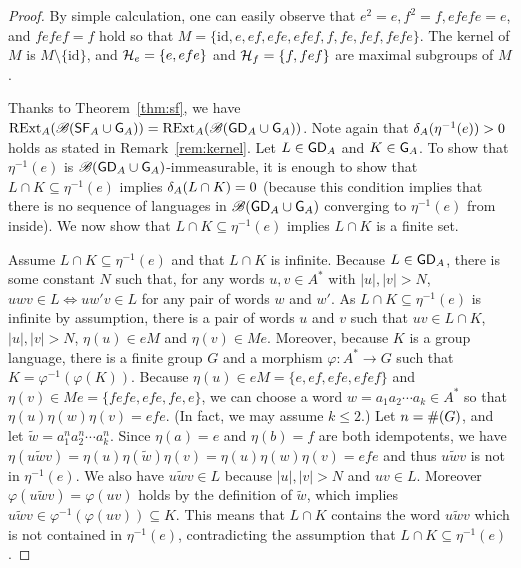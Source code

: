 \begin{proof}
By simple calculation, one can easily observe that 
\(e^2 = e, f^2 = f, efefe = e\), and \(fefef = f\) hold so that 
\(M = \{\mathrm{id},e,ef,efe,efef,f,fe,fef,fefe\}\).
The kernel of \(M\) is \(M \setminus \{\mathrm{id}\}\), and
\(\mathord{\mathrel{\cal H}_e} = \{e, efe\}\) and \(\mathord{\mathrel{\cal H}_f} = \{f, fef\}\) are maximal subgroups of \(M\).

Thanks to Theorem~\ref{thm:sf}, we have 
\(\mathrm{RExt}_A({\mathscr B}(\mathsf{SF}_A \cup \mathsf{G}_A)) = \mathrm{RExt}_A({\mathscr B}(\mathsf{GD}_A \cup \mathsf{G}_A))\).
Note again that \(\delta_{A}(\eta^{-1}(e)) > 0\) holds as stated in Remark~\ref{rem:kernel}.
Let \(L \in \mathsf{GD}_A\) and \(K \in \mathsf{G}_A\).
To show that \(\eta^{-1}(e)\) is \({\mathscr B}(\mathsf{GD}_A \cup \mathsf{G}_A)\)-immeasurable, it is enough to show that \(L \cap K \subseteq \eta^{-1}(e)\) implies \(\delta_{A}(L \cap K) = 0\) (because this condition implies that there is no sequence of languages in \({\mathscr B}(\mathsf{GD}_A \cup \mathsf{G}_A)\) converging to \(\eta^{-1}(e)\) from inside).
We now show that \(L \cap K \subseteq \eta^{-1}(e)\) implies \(L \cap K\) is a finite set.

Assume \(L \cap K \subseteq \eta^{-1}(e)\) and that
\(L \cap K\) is infinite.
Because \(L \in \mathsf{GD}_A\), there is some constant \(N\) such that,
for any words \(u, v \in A^*\) with \(|u|, |v| > N\),
\(uwv \in L \Leftrightarrow uw'v \in L\) for any pair of words
\(w\) and \(w'\).
As \(L \cap K \subseteq \eta^{-1}(e)\) is infinite by assumption, there is a pair of words \(u\) and \(v\) such that \(uv \in L \cap K\), \(|u|, |v| > N\), \(\eta(u) \in eM\) and \(\eta(v) \in Me\).
Moreover, because \(K\) is a group language, there is a finite group \(G\) and a morphism \(\varphi\colon A^* \rightarrow G\) such that
\(K = \varphi^{-1}(\varphi(K))\).
Because \(\eta(u) \in eM = \{e, ef, efe, efef\}\) and \(\eta(v) \in Me = \{fefe, efe, fe, e\}\),
we can choose a word \(w = a_1 a_2 \cdots a_k \in A^*\) so that \(\eta(u) \eta(w) \eta(v) = e f e\).
(In fact, we may assume \(k \leq 2\).)
Let \(n = \#\!\left(G\right)\), and let \(\widetilde{w} = a_1^n a_2^n \cdots a_k^n\).
Since \(\eta(a) = e\) and \(\eta(b) = f\) are both idempotents, we have
\(\eta(u \widetilde{w} v) =
\eta(u) \eta(\widetilde{w}) \eta(v) =
\eta(u) \eta(w) \eta(v) = efe
\)
and thus \(u\widetilde{w}v\) is not in \(\eta^{-1}(e)\).
We also have \(u \widetilde{w}v \in L\) because \(|u|, |v| > N\) and \(uv \in L\).
Moreover \(\varphi(u\widetilde{w}v) = \varphi(uv)\) holds by the definition of \(\widetilde{w}\), which implies
\(u\widetilde{w}v \in \varphi^{-1}(\varphi(uv)) \subseteq K\).
This means that \(L \cap K\) contains the word \(u\widetilde{w}v\) which is not contained in \(\eta^{-1}(e)\), contradicting the assumption that \(L \cap K \subseteq \eta^{-1}(e)\).
\end{proof}

